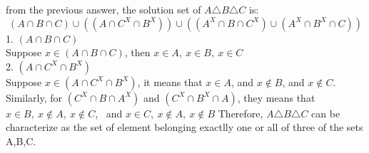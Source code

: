 \documentclass[a4paper,fleqn]{article}
\begin{document}
        from the previous answer, the solution set of \(A\triangle B \triangle C\) is:\\
        \[(A \cap B \cap C)\cup ((A\cap C^X \cap B^X))\cup ((A^X \cap B\cap C^X)\cup (A^X\cap B^X \cap C))\]
            1. \((A \cap B \cap C)\)\\
                Suppose \(x\in (A \cap B \cap C)\), then \(x\in A, \ x\in B, \ x \in C\)\\
            2. \((A\cap C^X \cap B^X)\)\\
                Suppose \(x\in (A\cap C^X \cap B^X)\), it means that \(x\in A\), and \(x\notin B\), and \(x\notin C\).
            Similarly, for \((C^X \cap B\cap A^X)\) and \((C^X\cap B^X \cap A)\), they means that \(x\in B, \ x\notin A, \ x \notin C\), \
            and \(x\in C, \ x\notin A, \ x \notin B\)
        Therefore, \(A\triangle B \triangle C\) 
        can be characterize as the set of element belonging exactlly one or all of three of the sets A,B,C.
\end{document}
